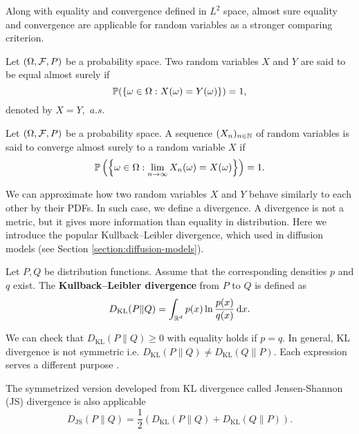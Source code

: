 Along with equality and convergence defined in $L^2$ space, almost sure equality and convergence are applicable for random variables as a stronger comparing criterion.

\begin{definition}
 Let $(\Omega, \mathcal{F}, P)$ be a probability space. Two random variables $X$ and $Y$ are said to be equal almost surely if
 $$\mathbb{P}(\{\omega\in\Omega : X(\omega)=Y(\omega)\})=1,$$
 denoted by $X=Y, \,\,a.s.$
\end{definition}

\begin{definition}
 Let $(\Omega, \mathcal{F}, P)$ be a probability space. A sequence $(X_n)_{n\in \mathbb{N}}$ of random variables is said to converge almost surely to a random variable $X$ if
 $$\mathbb{P}\left(\left\{\omega\in\Omega : \lim\limits_{n\to\infty}X_n(\omega)=X(\omega)\right\}\right)=1.$$
\end{definition}

We can approximate how two random variables $X$ and $Y$ behave similarly to each other by their PDFs. In such case, we define a divergence. A divergence is not a metric, but it gives more information than equality in distribution. Here we introduce the popular Kullback–Leibler divergence, which used in diffusion models (see Section \ref{section:diffusion-models}).

\begin{definition}
 \label{definition:KL-divergence}
 Let $P,Q$ be distribution functions. Assume that the corresponding densities $p$ and $q$ exist. The \textbf{Kullback–Leibler divergence} from $P$ to $Q$ is defined as
 \begin{equation}
  D_{\mathrm{KL}}(P\|Q) = \int_{\mathbb{R}^d} p(x)\ln\dfrac{p(x)}{q(x)}\,\mathrm{d} x.
 \end{equation}
\end{definition}

\begin{remark}
 We can check that $D_{\mathrm{KL}}(P\|Q)\ge0$ with equality holds if $p=q$. In general, KL divergence is not symmetric i.e. $D_{\mathrm{KL}}(P\|Q)\ne D_{\mathrm{KL}}(Q\|P).$ Each expression serves a different purpose \cite{bishop2006pattern}.

 The symmetrized version developed from KL divergence called Jensen-Shannon (JS) divergence is also applicable
 \begin{equation}
  D_{\mathrm{JS}}(P\|Q) = \dfrac{1}{2}\left(D_{\mathrm{KL}}(P\|Q) + D_{\mathrm{KL}}(Q\|P)\right).
 \end{equation}
\end{remark}

